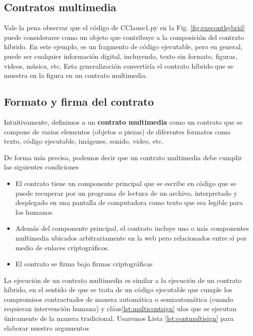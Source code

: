 \documentclass[12pt]{report} %
\begin{document}
\subsection{Contratos multimedia}

Vale la pena observar que el código de CClause1.py en la Fig. \ref{fig:execonthybrid}  puede considerarse como un objeto que contribuye a la composición del contrato híbrido. En este ejemplo, es un fragmento de código ejecutable, pero en general, puede ser cualquier información digital, incluyendo, texto sin formato, figuras, videos, música, etc. Esta generalización convertiría el contrato híbrido que se muestra en la figura en un contrato multimedia.

\subsection{Formato y firma del contrato}

Intuitivamente, definimos a un \textbf{contrato multimedia} como un contrato que se compone de varios elementos (objetos o piezas) de diferentes formatos como texto, código ejecutable, imágenes, sonido, video, etc.

De forma más precisa, podemos decir que un contrato multimedia debe cumplir las siguientes condiciones

\begin{itemize}
    \item El contrato tiene un componente principal que se escribe en código que se puede recuperar por un programa de lectura de un archivo, interpretado y desplegado en una pantalla de computadora como texto que sea legible para los humanos.

    \item Además del componente principal, el contrato incluye uno o más componentes multimedia  ubicados arbitrariamente en la web pero relacionados entre sí por medio de enlaces criptográficos.

    \item El contrato se firma bajo firmas criptográficas
\end{itemize}

La ejecución de un contrato multimedia es similar a la ejecución de un contrato híbrido, en el sentido de que se trata de un código ejecutable que cumple los compromisos contractuales de manera automática o semiautomática (cuando requieran intervención humana)  y cláus\ref{lst:multicontsign} ulas que se ejecutan únicamente de la manera tradicional. Usaremos Lista \ref{lst:contmultisign} para elaborar nuestro argumentos
\end{document}
